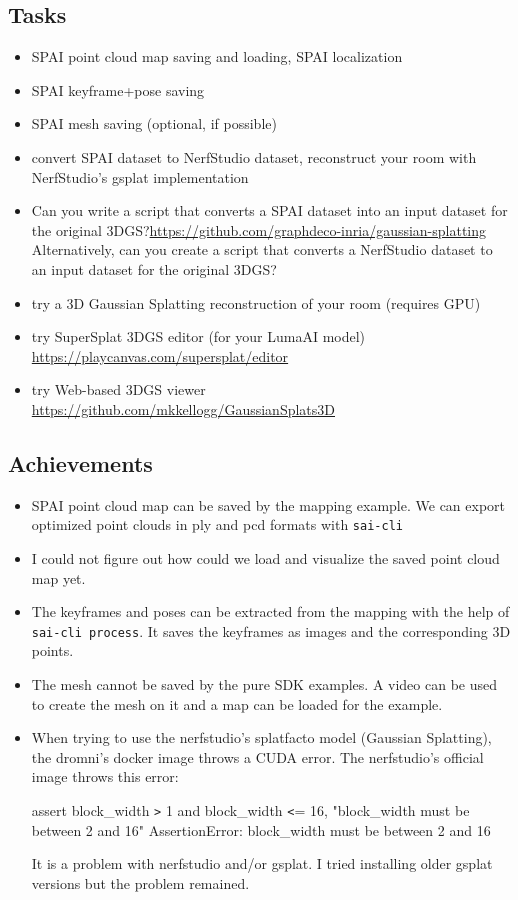 \documentclass{article}
\begin{document}
\subsection{Tasks}
\begin{itemize}
\item SPAI point cloud map saving and loading, SPAI localization 
\item SPAI keyframe+pose saving 
\item SPAI mesh saving (optional, if possible) 
\item convert SPAI dataset to NerfStudio dataset, reconstruct your room with NerfStudio's gsplat implementation 
\item Can you write a script that converts a SPAI dataset into an input dataset for the original 3DGS?\url{https://github.com/graphdeco-inria/gaussian-splatting} Alternatively, can you create a script that converts a NerfStudio dataset to an input dataset for the original 3DGS?
\item try a 3D Gaussian Splatting reconstruction of your room (requires GPU) 
\item try SuperSplat 3DGS editor (for your LumaAI model) \url{https://playcanvas.com/supersplat/editor}
\item try Web-based 3DGS viewer \url{https://github.com/mkkellogg/GaussianSplats3D}
\end{itemize}

\subsection{Achievements}
\begin{itemize}
    \item SPAI point cloud map can be saved by the mapping example. We can export optimized point clouds in ply and pcd formats with \verb|sai-cli|
    \item I could not figure out how could we load and visualize the saved point cloud map yet.
    \item The keyframes and poses can be extracted from the mapping with the help of \verb|sai-cli process|. It saves the keyframes as images and the corresponding 3D points.
    \item The mesh cannot be saved by the pure SDK examples. A video can be used to create the mesh on it and a map can be loaded for the example.
    \item When trying to use the nerfstudio's splatfacto model (Gaussian Splatting), the dromni's docker image throws a CUDA error. The nerfstudio's official image throws this error:\par
    assert block\_width \verb|>| 1 and block\_width \verb|<|= 16, "block\_width must be between 2 and 16"
    AssertionError: block\_width must be between 2 and 16\par
    It is a problem with nerfstudio and/or gsplat. I tried installing older gsplat versions but the problem remained.
\end{itemize}
\end{document}

